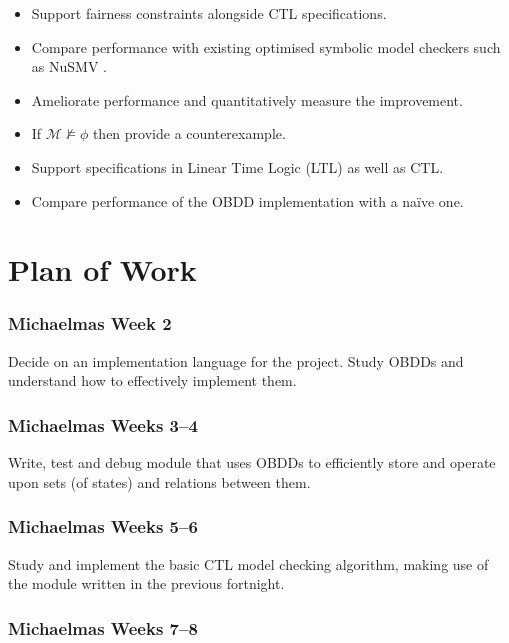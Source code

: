 \documentclass[12pt,a4paper,twoside]{article}
\newcommand{\M}{\mathcal{M}}
\begin{document}
\begin{itemize}
	\item Support fairness constraints alongside CTL specifications.
	
	\item Compare performance with existing optimised symbolic model checkers
	such as NuSMV \cite{nusmv}.
	
	\item Ameliorate performance and quantitatively measure the improvement.
	
	\item If $\M \not\models \phi$ then provide a counterexample.
	
	\item Support specifications in Linear Time Logic (LTL) as well as CTL.
	
	\item Compare performance of the OBDD implementation with a na\"ive one.
\end{itemize}

\section*{Plan of Work}

\subsubsection*{Michaelmas Week 2}

Decide on an implementation language for the project. Study OBDDs and understand
how to effectively implement them.

\subsubsection*{Michaelmas Weeks 3--4}

Write, test and debug module that uses OBDDs to efficiently store and operate
upon sets (of states) and relations between them.

\subsubsection*{Michaelmas Weeks 5--6}

Study and implement the basic CTL model checking algorithm, making use of the
module written in the previous fortnight.

\subsubsection*{Michaelmas Weeks 7--8}
\end{document}
